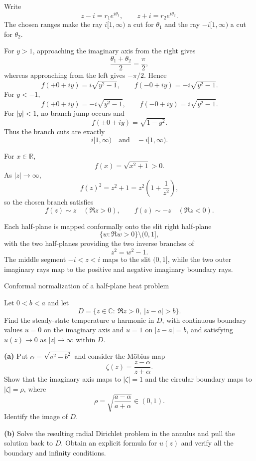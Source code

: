 

\begin{solution}
Write
\[
z-i=r_1e^{i\theta_1},
\qquad
z+i=r_2e^{i\theta_2}.
\]
The chosen ranges make the ray \(i[1,\infty)\) a cut for \(\theta_1\) and the ray \(-i[1,\infty)\) a cut for \(\theta_2\).

For \(y>1\), approaching the imaginary axis from the right gives
\[
\frac{\theta_1+\theta_2}{2}=\frac{\pi}{2},
\]
whereas approaching from the left gives \(-\pi/2\). Hence
\[
f(+0+iy)=i\sqrt{y^2-1},
\qquad
f(-0+iy)=-i\sqrt{y^2-1}.
\]
For \(y<-1\),
\[
f(+0+iy)=-i\sqrt{y^2-1},
\qquad
f(-0+iy)=i\sqrt{y^2-1}.
\]
For \(|y|<1\), no branch jump occurs and
\[
f(\pm0+iy)=\sqrt{1-y^2}.
\]
Thus the branch cuts are exactly
\[
i[1,\infty)
\quad\text{and}\quad
-i[1,\infty).
\]

For \(x\in\mathbb R\),
\[
f(x)=\sqrt{x^2+1}>0.
\]
As \(|z|\to\infty\),
\[
f(z)^2=z^2+1=z^2\left(1+\frac1{z^2}\right),
\]
so the chosen branch satisfies
\[
f(z)\sim z
\quad(\Re z>0),
\qquad
f(z)\sim -z
\quad(\Re z<0).
\]

Each half-plane is mapped conformally onto the slit right half-plane
\[
\{w:\Re w>0\}\setminus(0,1],
\]
with the two half-planes providing the two inverse branches of
\[
z^2=w^2-1.
\]
The middle segment \(-i<z<i\) maps to the slit \((0,1]\), while the two outer imaginary rays map to the positive and negative imaginary boundary rays.
\end{solution}


\begin{problem}[CP-IV-0007]
\label{prob:cp-iv-0007}
Conformal normalization of a half-plane heat problem

Let $0<b<a$ and let
\[
D=\{z\in\mathbb C:\ \Re z>0,\ |z-a|>b\}.
\]
Find the steady-state temperature $u$ harmonic in $D$, with continuous boundary
values $u=0$ on the imaginary axis and $u=1$ on $|z-a|=b$, and satisfying
$u(z)\to0$ as $|z|\to\infty$ within $D$.

\par\noindent\textbf{(a)} Put $\alpha=\sqrt{a^2-b^2}$ and consider the M\"obius map
\[
\zeta(z)=\frac{z-\alpha}{z+\alpha}.
\]
Show that the imaginary axis maps to $|\zeta|=1$ and the circular boundary maps
to $|\zeta|=\rho$, where
\[
\rho=\sqrt{\frac{a-\alpha}{a+\alpha}}\in(0,1).
\]
Identify the image of $D$.

\par\noindent\textbf{(b)} Solve the resulting radial Dirichlet problem in the
annulus and pull the solution back to $D$. Obtain an explicit formula for
$u(z)$ and verify all the boundary and infinity conditions.

\end{problem}

